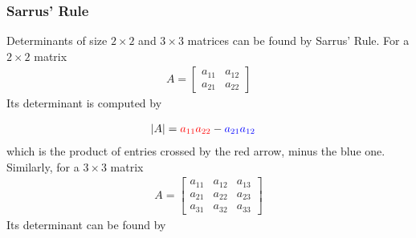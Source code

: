 \subsubsection{Sarrus' Rule}
\begin{proper}
\label{proper:sarrus}
Determinants of size $2 \times 2$ and $3 \times 3$ matrices can be found by Sarrus' Rule. For a $2 \times 2$ matrix
\begin{align*}
A =
\begin{bmatrix}
a_{11} & a_{12} \\
a_{21} & a_{22}
\end{bmatrix} 
\end{align*}
Its determinant is computed by
\vspace{-6pt}
\begin{center}
\end{center}
\vspace{-26pt}
\begin{align}
\abs{A} &= \textcolor{red}{a_{11}a_{22}} - \textcolor{blue}{a_{21}a_{12}}
\end{align}
which is the product of entries crossed by the red arrow, minus the blue one. Similarly, for a $3 \times 3$ matrix
\begin{align*}
A =
\begin{bmatrix}
a_{11} & a_{12} & a_{13} \\
a_{21} & a_{22} & a_{23} \\
a_{31} & a_{32} & a_{33}
\end{bmatrix} 
\end{align*}
Its determinant can be found by
\vspace{-6pt}
\begin{center}
\begin{tikzpicture}

\end{tikzpicture}
\end{center}
\end{proper}
